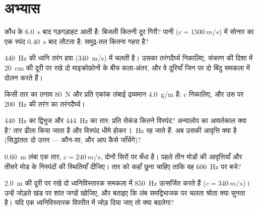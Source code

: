 \section{अभ्यास}

\begin{exercise}[$\star$]\label{exo:b1:wave-propagation:1}
कौंध के \qty{6.0}{s} बाद गड़गड़ाहट आती है: बिजली कितनी दूर गिरी? पानी
($c = \qty{1500}{m/s}$) में सोनार का एक स्पंद \qty{0.40}{s} बाद लौटता है:
समुद्र-तल कितना गहरा है?
\end{exercise}

\begin{exercise}[$\star$]\label{exo:b1:wave-propagation:2}
\qty{440}{Hz} की ध्वनि तरंग हवा (\qty{340}{m/s}) में चलती है। उसका
तरंगदैर्घ्य निकालिए, संचरण की दिशा में \qty{20}{cm} की दूरी पर रखे दो
माइक्रोफ़ोनों के बीच कला-अंतर, और वे दूरियाँ जिन पर दो बिंदु समकला में दोलन
करते हैं।
\end{exercise}

\begin{exercise}[$\star$]\label{exo:b1:wave-propagation:3}
किसी तार का तनाव \qty{80}{N} और प्रति एकांक लंबाई द्रव्यमान
\qty{4.0}{g/m} है: $c$ निकालिए, और उस पर \qty{200}{Hz} की तरंग का
तरंगदैर्घ्य।
\end{exercise}

\begin{exercise}[$\star$]\label{exo:b1:wave-propagation:4}
\qty{440}{Hz} का द्विभुज और \qty{444}{Hz} का तार: प्रति सेकंड कितने विस्पंद?
अन्वालोप का आवर्तकाल क्या है? तार ढीला किया जाता है और विस्पंद धीमे होकर
\qty{1}{Hz} रह जाते हैं: अब उसकी आवृत्ति क्या है (सिद्धांततः दो उत्तर ---
कौन-सा, और आप कैसे जाँचेंगे)?
\end{exercise}

\begin{exercise}[$\star\star$]\label{exo:b1:wave-propagation:5}
\qty{0.60}{m} लंबा एक तार, $c = \qty{240}{m/s}$, दोनों सिरों पर बँधा है।
पहले तीन मोडों की आवृत्तियाँ और तीसरे मोड के निस्पंदों की स्थितियाँ दीजिए।
तार को कहाँ छूना चाहिए ताकि वह \qty{600}{Hz} पर बजे?
\end{exercise}

\begin{exercise}[$\star\star$]\label{exo:b1:wave-propagation:6}
\qty{2.0}{m} की दूरी पर रखे दो ध्वनिविस्तारक समकला में \qty{850}{Hz}
उत्सर्जित करते हैं ($c = \qty{340}{m/s}$)। उन्हें जोड़ते खंड पर शांत जगहें
खोजिए, और बताइए कि लंब समद्विभाजक पर चलता श्रोता क्या सुनता है। यदि एक
ध्वनिविस्तारक विपरीत  में जोड़ दिया जाए तो क्या बदलेगा?
\end{exercise}

